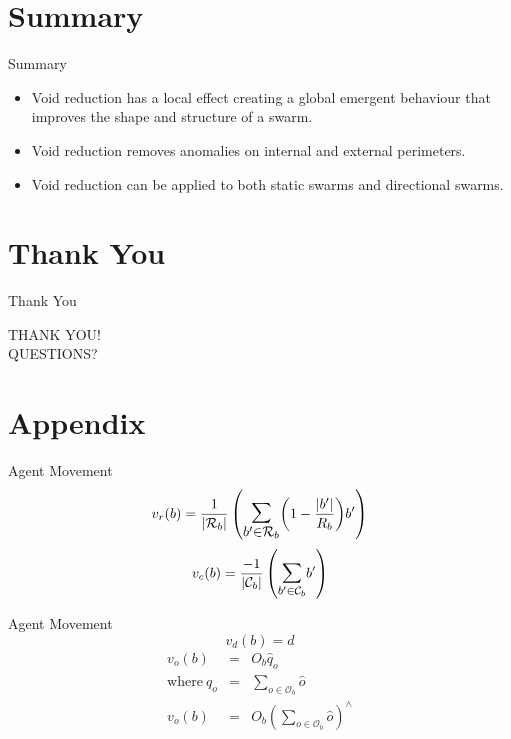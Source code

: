 \documentclass{beamer}
\newcommand{\card}[1]{\vert{#1}\vert}
\newcommand{\magn}[1]{\vert{#1}\vert}
\begin{document}
\section*{Summary}

\begin{frame}{Summary}
  \begin{itemize}
  \item
    \alert{Void reduction} has a local effect creating a global emergent behaviour that improves the shape and structure of a swarm.
  \item
    \alert{Void reduction} removes anomalies on internal and external perimeters.
  \item
    \alert{Void reduction} can be applied to both static swarms and directional swarms.
  \end{itemize}
\end{frame}

\section*{Thank You}

\begin{frame}{Thank You}
  \begin{center}
  THANK YOU!\\
  QUESTIONS?
  \end{center}
\end{frame}

\section*{Appendix}

\begin{frame}{Agent Movement}
  \begin{equation}\label{eq:Repulsion1}
    v_r(b) = 
    \frac{1}{\card{\mathcal R_b}}
    \left(
      \mathlarger{\mathlarger{\sum_{b' \in \mathcal R_b}}}
      {\left( 1-\frac{\magn{b'}}{R_b} \right)}
      b'
    \right)
    \end{equation}
    \begin{equation}\label{eq:FlyToCentre1}
      v_c(b) =
      \frac{-1}{\card{\mathcal C_b}}\left({\mathlarger{\sum_{b' \in
      \mathcal C_b}}{b'}}\right)
    \end{equation}
\end{frame}

\begin{frame}{Agent Movement}
    \begin{equation}\label{eq:Direction}
      v_d(b) = d
    \end{equation}
    \begin{eqnarray}\label{eq:Obstacle2}
      v_o(b) & = & O_b \hat q_o \\
      \mathrm{where~}  q_o & = & \sum_{o\in \mathcal O_b } \hat o
      \nonumber \\
      v_o(b) & = & O_b \left(\sum_{o\in \mathcal O_b }\hat o\right)^{\!\!\wedge} \nonumber
    \end{eqnarray}
\end{frame}
\end{document}
